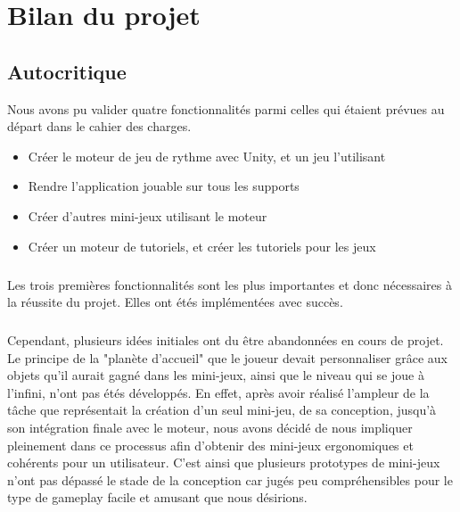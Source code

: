 \chapter{Bilan du projet}

\section{Autocritique}
Nous avons pu valider quatre fonctionnalités parmi celles qui étaient prévues au départ dans le cahier des charges.
\begin{itemize}
\item Créer le moteur de jeu de rythme avec Unity, et un jeu l'utilisant
\item Rendre l'application jouable sur tous les supports
\item Créer d'autres mini-jeux utilisant le moteur
\item Créer un moteur de tutoriels, et créer les tutoriels pour les jeux
\end{itemize}

\paragraph{}
Les trois premières fonctionnalités sont les plus importantes et donc nécessaires à la réussite du projet. Elles ont étés implémentées avec succès.

\paragraph{}
Cependant, plusieurs idées initiales ont du être abandonnées en cours de projet. Le principe de la "planète d'accueil" que le joueur devait personnaliser grâce aux objets qu'il aurait gagné dans les mini-jeux, ainsi que le niveau qui se joue à l'infini, n'ont pas étés développés. En effet, après avoir réalisé l'ampleur de la tâche que représentait la création d'un seul mini-jeu, de sa conception, jusqu'à son intégration finale avec le moteur, nous avons décidé de nous impliquer pleinement dans ce processus afin d'obtenir des mini-jeux ergonomiques et cohérents pour un utilisateur. C'est ainsi que plusieurs prototypes de mini-jeux n'ont pas dépassé le stade de la conception car jugés peu compréhensibles pour le type de gameplay facile et amusant que nous désirions.

